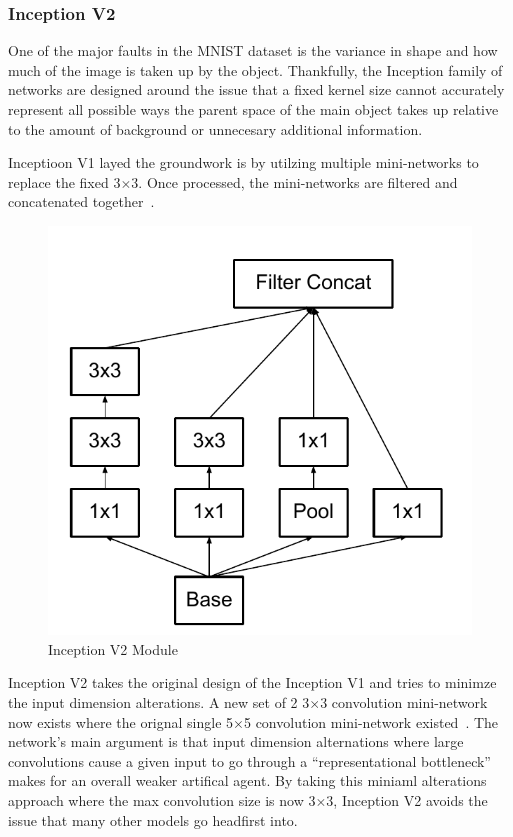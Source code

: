 \documentclass[conference]{IEEEtran}
\begin{document}
\subsubsection{Inception V2}\label{Inception-V2}



One of the major faults in the MNIST dataset is the variance in shape and how
much of the image is taken up by the object. Thankfully, the Inception family of
networks are designed around the issue that a fixed kernel size cannot
accurately represent all possible ways the parent space of the main object takes
up relative to the amount of background or unnecesary additional information.



Inceptioon V1 layed the groundwork is by utilzing multiple mini-networks to
replace the fixed 3$\times$3. Once  processed, the mini-networks are filtered
and concatenated together~\cite{inception_v1_paper}.


\begin{figure}[H]
  \centering
  \includegraphics[width=0.8\linewidth]{figures/inceptionv2_block.pdf}
  \caption{Inception V2 Module~\cite{inception_v2_paper}}%
\end{figure}


Inception V2 takes the original design of the Inception V1 and tries to minimze
the input dimension alterations. A new set of 2 3$\times$3 convolution
mini-network now exists where the orignal single 5$\times$5 convolution
mini-network existed~\cite{inception_v2_paper}. The network's main argument is that input dimension
alternations where large convolutions cause a given input to go through a
``representational bottleneck'' makes for an overall weaker artifical agent. By
taking this miniaml alterations approach where the max convolution size is now
3$\times$3, Inception V2 avoids the issue that many other models go headfirst
into.
\end{document}
